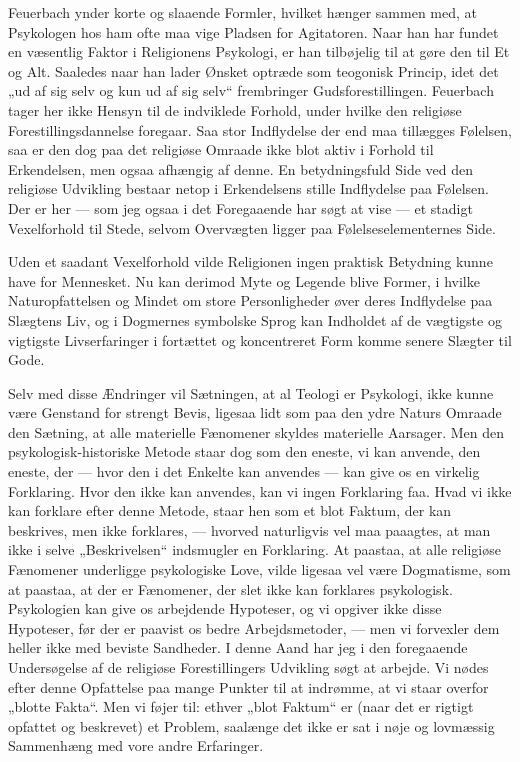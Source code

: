 \documentclass[12pt,a4paper,openany]{book}
\newcommand{\opage}[1]{\marginnote{\footnotesize\textit{[#1]}}}
\begin{document}
Feuerbach ynder korte og slaaende Formler, hvilket hænger sammen med, at
Psykologen hos ham ofte maa vige Pladsen for Agitatoren. Naar han har
fundet en væsentlig Faktor i Religionens Psykologi, er han tilbøjelig
til at gøre den til Et og Alt. Saaledes naar han lader Ønsket optræde
som teogonisk Princip, idet det „ud af sig selv og kun ud af sig selv“
frembringer Gudsforestillingen. Feuerbach tager her ikke Hensyn til de
indviklede Forhold, under hvilke den religiøse Forestillingsdannelse
foregaar. Saa stor Indflydelse der end maa tillægges Følelsen, saa er
den dog paa det religiøse Omraade ikke blot aktiv i Forhold til
Erkendelsen, men ogsaa afhængig af denne. En betydningsfuld Side ved den
religiøse Udvikling bestaar netop i Erkendelsens stille Indflydelse paa
Følelsen. Der er her --- som jeg ogsaa i det Foregaaende har søgt at
vise --- et stadigt Vexelforhold til Stede, selvom Overvægten ligger paa
Følelseselementernes Side.

Uden et saadant Vexelforhold vilde Religionen ingen praktisk Betydning
kunne have for Mennesket. Nu kan derimod Myte og Legende blive Former, i
hvilke Naturopfattelsen og Mindet om store Personligheder øver deres
Indflydelse paa Slægtens Liv, og i Dogmernes symbolske Sprog kan
Indholdet af de vægtigste og vigtigste Livserfaringer i fortættet og
koncentreret Form komme senere Slægter til Gode.

\opage{130}Selv med disse Ændringer vil Sætningen, at al Teologi er
Psykologi, ikke kunne være Genstand for strengt Bevis, ligesaa lidt som
paa den ydre Naturs Omraade den Sætning, at alle materielle Fænomener
skyldes materielle Aarsager. Men den psykologisk-historiske Metode staar
dog som den eneste, vi kan anvende, den eneste, der --- hvor den i det
Enkelte kan anvendes --- kan give os en virkelig Forklaring. Hvor den
ikke kan anvendes, kan vi ingen Forklaring faa. Hvad vi ikke kan
forklare efter denne Metode, staar hen som et blot Faktum, der kan
beskrives, men ikke forklares, --- hvorved naturligvis vel maa paaagtes,
at man ikke i selve „Beskrivelsen“ indsmugler en Forklaring. At paastaa,
at alle religiøse Fænomener underligge psykologiske Love, vilde ligesaa
vel være Dogmatisme, som at paastaa, at der er Fænomener, der slet ikke
kan forklares psykologisk. Psykologien kan give os arbejdende Hypoteser,
og vi opgiver ikke disse Hypoteser, før der er paavist os bedre
Arbejdsmetoder, --- men vi forvexler dem heller ikke med beviste
Sandheder. I denne Aand har jeg i den foregaaende Undersøgelse af de
religiøse Forestillingers Udvikling søgt at arbejde. Vi nødes efter
denne Opfattelse paa mange Punkter til at indrømme, at vi staar overfor
„blotte Fakta“. Men vi føjer til: ethver „blot Faktum“ er (naar det er
rigtigt opfattet og beskrevet) et Problem, saalænge det ikke er sat i
nøje og lovmæssig Sammenhæng med vore andre Erfaringer.
\end{document}
